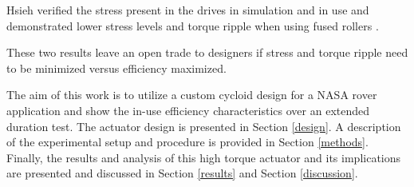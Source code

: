 Hsieh verified the stress present in the drives in simulation and in use and demonstrated lower stress levels and torque ripple when using fused rollers \cite{hsieh_dynamics}.

These two results leave an open trade to designers if stress and torque ripple need to be minimized versus efficiency maximized.

The aim of this work is to utilize a custom cycloid design for a NASA rover application and show the in-use efficiency characteristics over an extended duration test.
The actuator design is presented in Section \ref{design}.
A description of the experimental setup and procedure is provided in Section \ref{methods}.
Finally, the results and analysis of this high torque actuator and its implications are presented and discussed in Section \ref{results} and Section \ref{discussion}.

